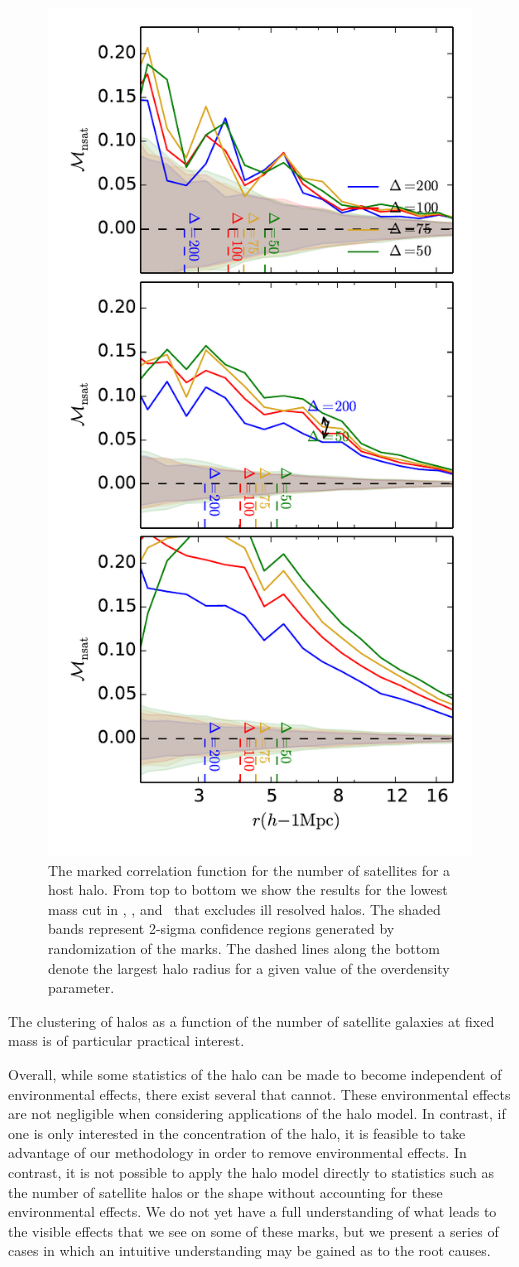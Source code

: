 \documentclass[usenatbib,usegraphicx,letterpaper]{mn2e}
\begin{document}
\begin{figure}
	\centering
	\includegraphics[width=.4\textwidth]{all_mcf_nsat_z00_cutcomp.pdf}
	\caption{The marked correlation function for the number of satellites for a host halo. From top to bottom we show the results for the lowest mass cut in \simA, \simB, and \simC \ that excludes ill resolved halos. The shaded bands represent 2-sigma confidence regions generated by randomization of the marks. The dashed lines along the bottom denote the largest halo radius for a given value of the overdensity parameter.}
	\label{fig:cc_mcf_nsat}
\end{figure}


The clustering of halos as a function of the number of satellite galaxies at fixed mass is of 
particular practical interest. 



Overall, while some statistics of the halo can be made to become independent of environmental effects, there exist several that cannot. These environmental effects are not negligible when considering applications of the halo model. In contrast, if one is only interested in the concentration of the halo, it is feasible to take advantage of our methodology in order to remove environmental effects. In contrast, it is not possible to apply the halo model directly to statistics such as the number of satellite halos or the shape without accounting for these environmental effects. We do not yet have a full understanding of what leads to the visible effects that we see on some of these marks, but we present a series of cases in which an intuitive understanding may be gained as to the root causes.
\end{document}
